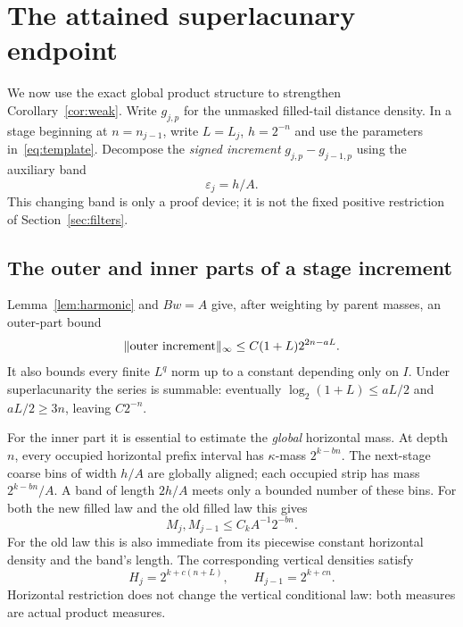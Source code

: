 \section{The attained superlacunary endpoint}\label{sec:superlacunary}
We now use the exact global product structure to strengthen
Corollary~\ref{cor:weak}. Write $g_{j,p}$ for the unmasked filled-tail
distance density. In a stage beginning at $n=n_{j-1}$, write $L=L_j$,
$h=2^{-n}$ and use the parameters in~\eqref{eq:template}. Decompose the
\emph{signed increment} $g_{j,p}-g_{j-1,p}$ using the auxiliary band
\begin{equation}\label{eq:aux-band}
 \varepsilon_j=h/A.
\end{equation}
This changing band is only a proof device; it is not the fixed positive
restriction of Section~\ref{sec:filters}.

\subsection{The outer and inner parts of a stage increment}
Lemma~\ref{lem:harmonic} and $Bw=A$ give, after weighting by parent
masses, an outer-part bound
\begin{equation}\label{eq:outer}
 \lVert \text{outer increment}\rVert_\infty
 \leq C(1+L)2^{2n-aL}.
\end{equation}
It also bounds every finite $L^q$ norm up to a constant depending only on
$I$. Under superlacunarity the series is summable: eventually
$\log_2(1+L)\leq aL/2$ and $aL/2\geq3n$, leaving $C2^{-n}$.

For the inner part it is essential to estimate the \emph{global} horizontal
mass. At depth $n$, every occupied horizontal prefix interval has
$\kappa$-mass $2^{k-bn}$. The next-stage coarse bins of width $h/A$
are globally aligned; each occupied strip has mass $2^{k-bn}/A$.
A band of length $2h/A$ meets only a bounded number of these bins.
For both the new filled law and the old filled law this gives
\begin{equation}\label{eq:global-M}
 M_j,M_{j-1}\leq C_k A^{-1}2^{-bn}.
\end{equation}
For the old law this is also immediate from its piecewise constant
horizontal density and the band's length. The corresponding vertical
densities satisfy
\begin{equation}\label{eq:global-H}
 H_j=2^{k+c(n+L)},\qquad H_{j-1}=2^{k+cn}.
\end{equation}
Horizontal restriction does not change the vertical conditional law:
both measures are actual product measures.

